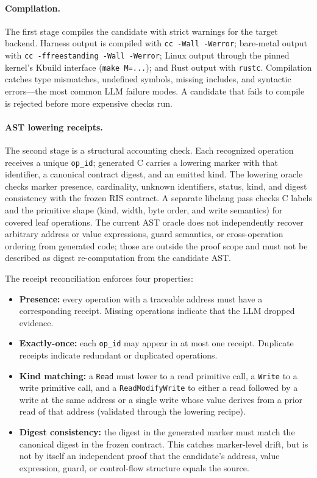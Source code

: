 \paragraph{Compilation.}

The first stage compiles the candidate with strict warnings for the target
backend. Harness output is compiled with \texttt{cc\,-Wall\,-Werror}; bare-metal
output with \texttt{cc\,-ffreestanding\,-Wall\,-Werror}; Linux output through the
pinned kernel's Kbuild interface (\texttt{make\,M=...}); and Rust output with
\texttt{rustc}. Compilation catches type mismatches, undefined symbols, missing
includes, and syntactic errors---the most common LLM failure modes. A
candidate that fails to compile is rejected before more expensive checks run.

\paragraph{AST lowering receipts.}

The second stage is a structural accounting check. Each recognized operation
receives a unique \texttt{op\_id}; generated C carries a lowering marker with
that identifier, a canonical contract digest, and an emitted kind. The
lowering oracle checks marker presence, cardinality, unknown identifiers,
status, kind, and digest consistency with the frozen RIS contract. A separate
libclang pass checks C labels and the primitive shape (kind, width, byte order,
and write semantics) for covered leaf operations. The current AST oracle does
not independently recover arbitrary address or value expressions, guard
semantics, or cross-operation ordering from generated code; those are outside
the proof scope and must not be described as digest re-computation from the
candidate AST.

The receipt reconciliation enforces four properties:

\begin{itemize}
\item \textbf{Presence:} every \rislang{} operation with a traceable address
must have a corresponding receipt. Missing operations indicate that the LLM
dropped evidence.
\item \textbf{Exactly-once:} each \texttt{op\_id} may appear in at most one
receipt. Duplicate receipts indicate redundant or duplicated operations.
\item \textbf{Kind matching:} a \rislang{} \texttt{Read} must lower to a read
primitive call, a \texttt{Write} to a write primitive call, and a
\texttt{ReadModifyWrite} to either a read followed by a write at the same
address or a single write whose value derives from a prior read of that
address (validated through the lowering recipe).
\item \textbf{Digest consistency:} the digest in the generated marker must
match the canonical digest in the frozen contract. This catches marker-level
drift, but is not by itself an independent proof that the candidate's address,
value expression, guard, or control-flow structure equals the source.
\end{itemize}

